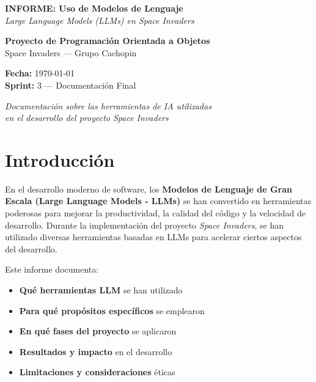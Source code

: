 \documentclass[12pt, a4paper]{article}
\begin{document}
\begin{titlepage}
    \centering
    \vspace*{2cm}
    
    {\LARGE \textbf{INFORME: Uso de Modelos de Lenguaje}}\\[0.5em]
    {\Large \textit{Large Language Models (LLMs) en Space Invaders}}\\[1.5em]
    
    \vspace{1cm}
    
    {\large \textbf{Proyecto de Programación Orientada a Objetos}}\\[0.3em]
    {\large Space Invaders — Grupo Cachopin}\\[1em]
    
    \vspace{2cm}
    
    {\textbf{Fecha:}} \today\\[0.5em]
    {\textbf{Sprint:}} 3 — Documentación Final\\[3em]
    
    \vspace{2cm}
    
    {\large \textit{Documentación sobre las herramientas de IA utilizadas}}\\[0.2em]
    {\large \textit{en el desarrollo del proyecto Space Invaders}}
    
    \vfill
    
\end{titlepage}

\newpage
\tableofcontents
\newpage

\section{Introducción}

En el desarrollo moderno de software, los \textbf{Modelos de Lenguaje de Gran Escala (Large Language Models - LLMs)} se han convertido en herramientas poderosas para mejorar la productividad, la calidad del código y la velocidad de desarrollo. Durante la implementación del proyecto \textit{Space Invaders}, se han utilizado diversas herramientas basadas en LLMs para acelerar ciertos aspectos del desarrollo.

Este informe documenta:

\begin{itemize}[leftmargin=2em]
    \item \textbf{Qué herramientas LLM} se han utilizado
    \item \textbf{Para qué propósitos específicos} se emplearon
    \item \textbf{En qué fases del proyecto} se aplicaron
    \item \textbf{Resultados y impacto} en el desarrollo
    \item \textbf{Limitaciones y consideraciones} éticas
\end{itemize}
\end{document}
